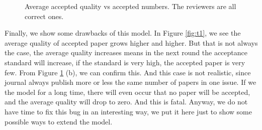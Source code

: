 \documentclass[11pt]{article}
\begin{document}
\begin{figure}[H]
    \begin{center}
    \caption{Average accepted quality vs accepted numbers. The reviewers are all correct ones.}
    \label{fig:t6}
    \end{center}
\end{figure}

Finally, we show some drawbacks of this model. In Figure \ref{fig:t1}, we see the average quality of accepted paper grows higher and higher. But that is not always the case, the average quality increases means in the next round the acceptance standard will increase, if the standard is very high, the accepted paper is very few. From Figure \ref{fig:t6} (b), we can confirm this. And this case is not realistic, since journal always publish more or less the same number of papers in one issue. If we the model for a long time, there will even occur that no paper will be accepted, and the average quality will drop to zero. And this is fatal. Anyway, we do not have time to fix this bug in an interesting way, we put it here just to show some possible ways to extend the model.
\end{document}
